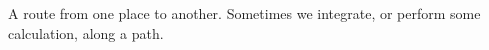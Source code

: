 A route from one place to another. Sometimes we integrate, or
perform some calculation, along a path.
